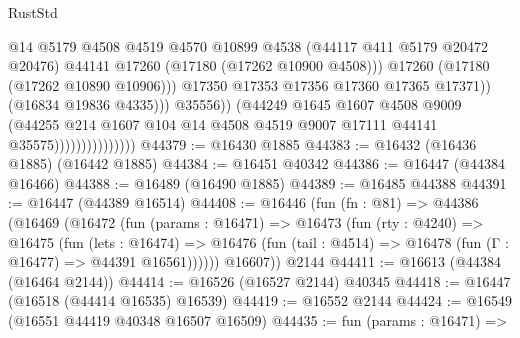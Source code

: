 \begin{lexlean}{RustStd}
\begin{coremodule}
                                              @14
                                              @5179
                                              @4508
                                              @4519
                                              @4570
                                              @10899
                                              @4538
                                              (@44117 @411 @5179 @20472 @20476)
                                              @44141
                                              @17260
                                              (@17180 (@17262 @10900 @4508)))
                                            @17260
                                            (@17180 (@17262 @10890 @10906)))
                                          @17350
                                          @17353
                                          @17356
                                          @17360
                                          @17365
                                          @17371))
                                      (@16834 @19836 @4335)))
                                  @35556))
                              (@44249
                                @1645
                                @1607
                                @4508
                                @9009
                                (@44255
                                  @214
                                  @1607
                                  @104
                                  @14
                                  @4508
                                  @4519
                                  @9007
                                  @17111
                                  @44141
                                  @35575)))))))))))))))
@44379 := @16430 @1885
@44383 := @16432 (@16436 @1885) (@16442 @1885)
@44384 := @16451 @40342
@44386 := @16447 (@44384 @16466)
@44388 := @16489 (@16490 @1885)
@44389 := @16485 @44388
@44391 := @16447 (@44389 @16514)
@44408 := @16446
    (fun (fn : @81) =>
    @44386
      (@16469
        (@16472
          (fun (params : @16471) =>
          @16473
            (fun (rty : @4240) =>
            @16475
              (fun (lets : @16474) =>
              @16476 (fun (tail : @4514) => @16478 (fun (Γ : @16477) => @44391 @16561))))))
        @16607))
    @2144
@44411 := @16613 (@44384 (@16464 @2144))
@44414 := @16526 (@16527 @2144) @40345
@44418 := @16447 (@16518 (@44414 @16535) @16539)
@44419 := @16552 @2144
@44424 := @16549 (@16551 @44419 @40348 @16507 @16509)
@44435 := fun (params : @16471) =>

\end{coremodule}
\end{lexlean}

